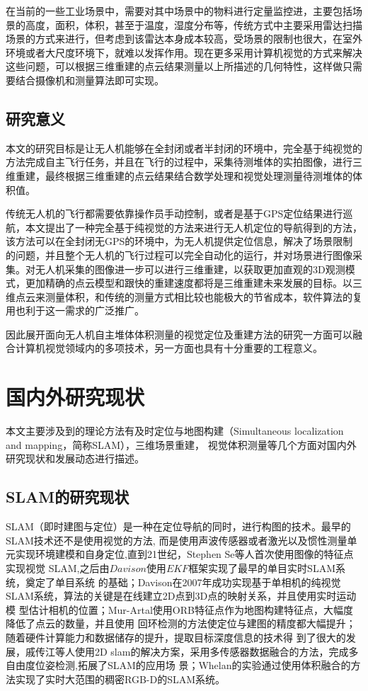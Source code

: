 在当前的一些工业场景中，需要对其中场景中的物料进行定量监控进，主要包括场景的高度，面积，体积，甚至于温度，湿度分布等，传统方式中主要采用雷达扫描场景的方式来进行，但考虑到该雷达本身成本较高，受场景的限制也很大，在室外环境或者大尺度环境下，就难以发挥作用。现在更多采用计算机视觉的方式来解决这些问题，可以根据三维重建的点云结果测量以上所描述的几何特性，这样做只需要结合摄像机和测量算法即可实现。
\subsection{研究意义}
\label{sec:1.1.2}
本文的研究目标是让无人机能够在全封闭或者半封闭的环境中，完全基于纯视觉的方法完成自主飞行任务，并且在飞行的过程中，采集待测堆体的实拍图像，进行三维重建，最终根据三维重建的点云结果结合数学处理和视觉处理测量待测堆体的体积值。

传统无人机的飞行都需要依靠操作员手动控制，或者是基于GPS定位结果进行巡航，本文提出了一种完全基于纯视觉的方法来进行无人机定位的导航得到的方法，该方法可以在全封闭无GPS的环境中，为无人机提供定位信息，解决了场景限制的问题，并且整个无人机的飞行过程可以完全自动化的运行，并对场景进行图像采集。对无人机采集的图像进一步可以进行三维重建，以获取更加直观的3D观测模式，更加精确的点云模型和跟快的重建速度都将是三维重建未来发展的目标。以三维点云来测量体积，和传统的测量方式相比较也能极大的节省成本，软件算法的复用也利于这一需求的广泛推广。

因此展开面向无人机自主堆体体积测量的视觉定位及重建方法的研究一方面可以融合计算机视觉领域内的多项技术，另一方面也具有十分重要的工程意义。
\section{国内外研究现状}
\label{sec:1.2}
本文主要涉及到的理论方法有及时定位与地图构建（Simultaneous localization and mapping，简称SLAM），三维场景重建，
视觉体积测量等几个方面对国内外研究现状和发展动态进行描述。
\subsection{SLAM的研究现状}
\label{sec:1.2.1}
SLAM（即时建图与定位）是一种在定位导航的同时，进行构图的技术\cite{cadena2016past}。最早的SLAM技术还不是使用视觉的方法,
而是使用声波传感器或者激光以及惯性测量单元实现环境建模和自身定位,直到21世纪，Stephen Se等人首次使用图像的特征点实现视觉
SLAM\cite{se2002mobile},之后由$Davison$使用$EKF$框架实现了最早的单目实时SLAM系统\cite{davison2003real}，奠定了单目系统
的基础；Davison在2007年成功实现基于单相机的纯视觉SLAM系统，算法的关键是在线建立2D点到3D点的映射关系，并且使用实时运动模
型估计相机的位置\cite{davison2007monoslam}；Mur-Artal使用ORB特征点作为地图构建特征点，大幅度降低了点云的数量，并且使用
回环检测的方法使定位与建图的精度都大幅提升\cite{mur2015orb}；随着硬件计算能力和数据储存的提升，提取目标深度信息的技术得
到了很大的发展，戚传江等人使用2D slam的解决方案，采用多传感器数据融合的方法，完成多自由度位姿检测,拓展了SLAM的应用场
景；Whelan的实验通过使用体积融合的方法实现了实时大范围的稠密RGB-D的SLAM系统\cite{whelan2015real}。

